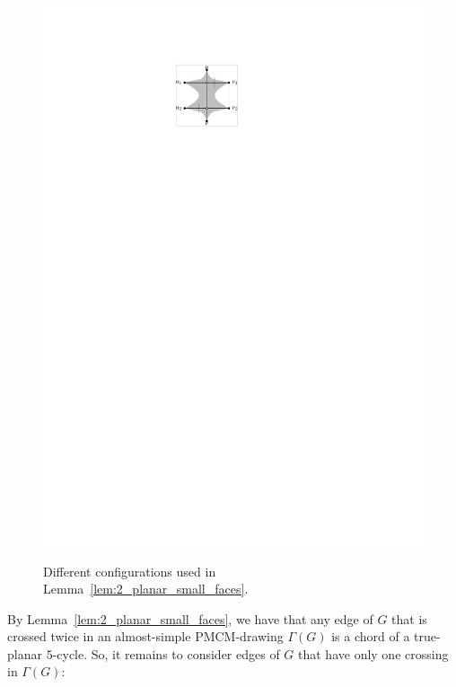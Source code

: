 \begin{figure}[htb]
\begin{minipage}[b]{.24\textwidth}
        \includegraphics[width=\textwidth,page=7]{images/2_planar_potential_parallel}
        \subcaption{~}\label{fig:2_planar_one_parallel_final}
    \end{minipage}
    \caption{%
    Different configurations used in Lemma~\ref{lem:2_planar_small_faces}.}
    \label{fig:2_planar_potential_parallel}
\end{figure}




By Lemma~\ref{lem:2_planar_small_faces}, we have that any edge of $G$ that is crossed twice in an almost-simple PMCM-drawing $\Gamma(G)$ is a chord of a true-planar $5$-cycle. So, it remains to consider edges of $G$ that have only one crossing in $\Gamma(G)$:

